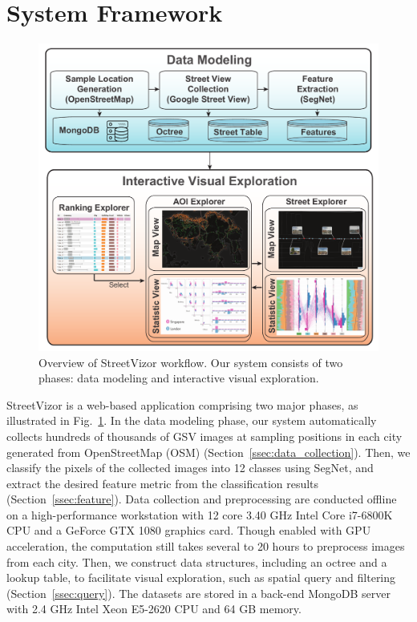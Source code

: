 \section{System Framework}



\begin{figure}[t]
	\centering
	\includegraphics[width=0.9\columnwidth]{figure/streetvizor/fig2_framework/framework}
	\vspace{-5mm}
	\caption{Overview of StreetVizor workflow. Our system consists of two phases: data modeling and interactive visual exploration.}
	\label{fig:sys_overview}
	\vspace{-6mm}
\end{figure}

StreetVizor is a web-based application comprising two major phases, as illustrated in Fig.~\ref{fig:sys_overview}.
In the data modeling phase, our system automatically collects hundreds of thousands of GSV images at sampling positions in each city generated from OpenStreetMap (OSM) (Section~\ref{ssec:data_collection}).
Then, we classify the pixels of the collected images into 12 classes using SegNet, and extract the desired feature metric from the classification results (Section~\ref{ssec:feature}).
Data collection and preprocessing are conducted offline on a high-performance workstation with 12 core 3.40 GHz Intel Core i7-6800K CPU and a GeForce GTX 1080 graphics card.
Though enabled with GPU acceleration, the computation still takes several to 20 hours to preprocess images from each city.
Then, we construct data structures, including an octree and a lookup table, to facilitate visual exploration, such as spatial query and filtering (Section~\ref{ssec:query}).
The datasets are stored in a back-end MongoDB server with 2.4 GHz Intel Xeon E5-2620 CPU and 64 GB memory.

